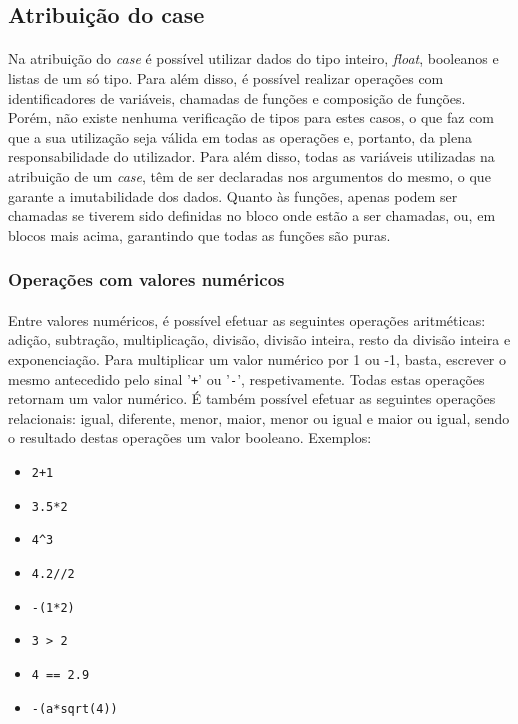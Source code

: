 \documentclass[11pt,a4paper]{report}
\begin{document}
\subsection{Atribuição do case}
\paragraph*{}
Na atribuição do \textit{case} é possível utilizar dados do tipo inteiro, \textit{float}, booleanos e listas de um só tipo. Para além disso, é possível realizar operações com identificadores de variáveis, chamadas de funções e composição de funções. Porém, não existe nenhuma verificação de tipos para estes casos, o que faz com que a sua utilização seja válida em todas as operações e, portanto, da plena responsabilidade do utilizador. Para além disso, todas as variáveis utilizadas na atribuição de um \textit{case}, têm de ser declaradas nos argumentos do mesmo, o que garante a imutabilidade dos dados. Quanto às funções, apenas podem ser chamadas se tiverem sido definidas no bloco onde estão a ser chamadas, ou, em blocos mais acima, garantindo que todas as funções são puras.

\subsubsection{Operações com valores numéricos}
\paragraph*{}
Entre valores numéricos, é possível efetuar as seguintes operações aritméticas: adição, subtração, multiplicação, divisão, divisão inteira, resto da divisão inteira e exponenciação. Para multiplicar um valor numérico por 1 ou -1, basta, escrever o mesmo antecedido pelo sinal '\texttt{+}' ou '\texttt{-}', respetivamente. Todas estas operações retornam um valor numérico. É também possível efetuar as seguintes operações relacionais: igual, diferente, menor, maior, menor ou igual e maior ou igual, sendo o resultado destas operações um valor booleano. Exemplos:

\begin{itemize}
    \item \texttt{2+1}
    \item \texttt{3.5*2}
    \item \texttt{4^3}
    \item \texttt{4.2//2}
    \item \texttt{-(1*2)}
    \item \texttt{3 > 2}
    \item \texttt{4 == 2.9}
     \item \texttt{-(a*sqrt(4))}
\end{itemize}
\end{document}
